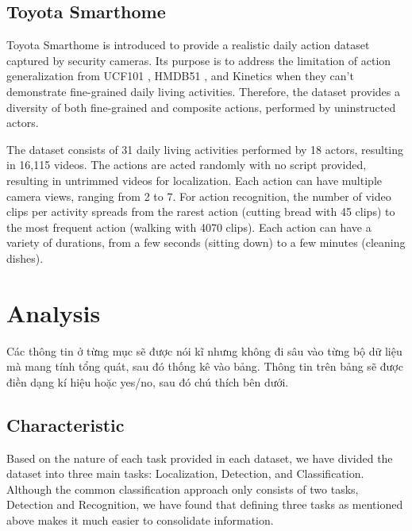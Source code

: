 \documentclass[a4paper]{article}
\begin{document}
\subsection{Toyota Smarthome}
Toyota Smarthome \cite{ToyotaSmarthome} is introduced to provide a realistic daily action dataset captured by security cameras. Its purpose is to address the limitation of action generalization from UCF101 \cite{UCF101}, HMDB51 \cite{HMDB51}, and Kinetics \cite{Kinetics-400} when they can't demonstrate fine-grained daily living activities. Therefore, the dataset provides a diversity of both fine-grained and composite actions, performed by uninstructed actors.

The dataset consists of 31 daily living activities performed by 18 actors, resulting in 16,115 videos. The actions are acted randomly with no script provided, resulting in untrimmed videos for localization. Each action can have multiple camera views, ranging from 2 to 7. For action recognition, the number of video clips per activity spreads from the rarest action (cutting bread with 45 clips) to the most frequent action (walking with 4070 clips). Each action can have a variety of durations, from a few seconds (sitting down) to a few minutes (cleaning dishes).
\section{Analysis}
Các thông tin ở từng mục sẽ được nói kĩ nhưng không đi sâu vào từng bộ dữ liệu mà mang tính tổng quát, sau đó thống kê vào bảng. Thông tin trên bảng sẽ được điền dạng kí hiệu hoặc yes/no, sau đó chú thích bên dưới.

\subsection{Characteristic}
Based on the nature of each task provided in each dataset, we have divided the dataset into three main tasks: Localization, Detection, and Classification. Although the common classification approach only consists of two tasks, Detection and Recognition, we have found that defining three tasks as mentioned above makes it much easier to consolidate information.
 
\end{document}
